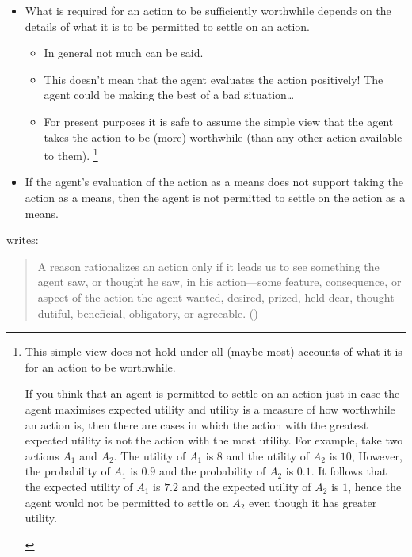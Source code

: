 \documentclass[10pt]{article}
\newcommand{\hand}{\ding{43}}
\newcommand{\hozlinedash}[0]{%
  \noindent\hdashrule[0.5ex][c]{\textwidth}{.1pt}{2.5pt}
}
\begin{document}
\begin{itemize}[noitemsep]
\item[\hand] What is required for an action to be sufficiently worthwhile depends on the details of what it is to be permitted to settle on an action.
  \begin{itemize}
  \item In general not much can be said.
  \end{itemize}
  \begin{itemize}[noitemsep]
  \item This doesn't mean that the agent evaluates the action positively!
    The agent could be making the best of a bad situation\dots
  \item[\hand] For present purposes it is safe to assume the simple view that the agent takes the action to be (more) worthwhile (than any other action available to them).\nolinebreak
    \footnote{
      This simple view does not hold under all (maybe most) accounts of what it is for an action to be worthwhile.
      \begin{example}
        If you think that an agent is permitted to settle on an action just in case the agent maximises expected utility and utility is a measure of how worthwhile an action is, then there are cases in which the action with the greatest expected utility is not the action with the most utility.
        For example, take two actions \(A_{1}\) and \(A_{2}\).
        The utility of \(A_{1}\) is \(8\) and the utility of \(A_{2}\) is \(10\),
        However, the probability of \(A_{1}\) is \(0.9\) and the probability of \(A_{2}\) is \(0.1\).
        It follows that the expected utility of \(A_{1}\) is \(7.2\) and the expected utility of \(A_{2}\) is \(1\), hence the agent would not be permitted to settle on \(A_{2}\) even though it has greater utility.
      \end{example}
    }
  \end{itemize}
\item If the agent's evaluation of the action as a means does not support taking the action as a means, then the agent is not permitted to settle on the action as a means.
\end{itemize}

\hozlinedash

\citeauthor{Davidson:1963aa} writes:

\begin{quote}
  A reason rationalizes an action only if it leads us to see something the agent saw, or thought he saw, in his action---some feature, consequence, or aspect of the action the agent wanted, desired, prized, held dear, thought dutiful, beneficial, obligatory, or agreeable.\nolinebreak
  \mbox{}\hfill\mbox{(\citeyear[686]{Davidson:1963aa})}
\end{quote}
\end{document}
